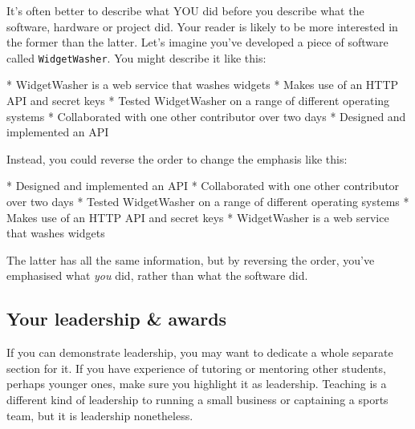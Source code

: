\documentclass[
]{book}
\newenvironment{Shaded}{\begin{snugshade}}{\end{snugshade}}
\newcommand{\NormalTok}[1]{#1}
\newcommand{\SpecialStringTok}[1]{\textcolor[rgb]{0.31,0.60,0.02}{#1}}
\begin{document}
It's often better to describe what YOU did before you describe what the software, hardware or project did. Your reader is likely to be more interested in the former than the latter. Let's imagine you've developed a piece of software called \texttt{WidgetWasher}. You might describe it like this:

\begin{Shaded}
\begin{Highlighting}[]
\SpecialStringTok{* }\NormalTok{WidgetWasher is a web service that washes widgets}
\SpecialStringTok{* }\NormalTok{Makes use of an HTTP API and secret keys}
\SpecialStringTok{* }\NormalTok{Tested WidgetWasher on a range of different operating systems}
\SpecialStringTok{* }\NormalTok{Collaborated with one other contributor over two days}
\SpecialStringTok{* }\NormalTok{Designed and implemented an API}
\end{Highlighting}
\end{Shaded}

Instead, you could reverse the order to change the emphasis like this:

\begin{Shaded}
\begin{Highlighting}[]
\SpecialStringTok{* }\NormalTok{Designed and implemented an API}
\SpecialStringTok{* }\NormalTok{Collaborated with one other contributor over two days}
\SpecialStringTok{* }\NormalTok{Tested WidgetWasher on a range of different operating systems}
\SpecialStringTok{* }\NormalTok{Makes use of an HTTP API and secret keys}
\SpecialStringTok{* }\NormalTok{WidgetWasher is a web service that washes widgets}
\end{Highlighting}
\end{Shaded}

The latter has all the same information, but by reversing the order, you've emphasised what \emph{you} did, rather than what the software did. 💪

\hypertarget{prizes}{%
\subsection{Your leadership \& awards}\label{prizes}}

If you can demonstrate leadership, you may want to dedicate a whole separate section for it. If you have experience of tutoring or mentoring other students, perhaps younger ones, make sure you highlight it as leadership. Teaching is a different kind of leadership to running a small business or captaining a sports team, but it is leadership nonetheless.
\end{document}
